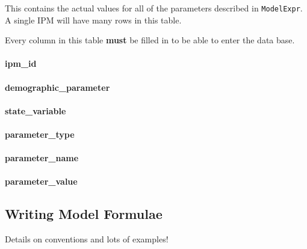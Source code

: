 \documentclass[]{article}
\let\oldparagraph\paragraph
\renewcommand{\paragraph}[1]{\oldparagraph{#1}\mbox{}}
\begin{document}
This contains the actual values for all of the parameters described in
\texttt{ModelExpr}. A single IPM will have many rows in this table.

Every column in this table \textbf{must} be filled in to be able to
enter the data base.

\paragraph{ipm\_id}\label{ipm_id-4}

\paragraph{demographic\_parameter}\label{demographic_parameter-1}

\paragraph{state\_variable}\label{state_variable-2}

\paragraph{parameter\_type}\label{parameter_type}

\paragraph{parameter\_name}\label{parameter_name}

\paragraph{parameter\_value}\label{parameter_value}

\hypertarget{model-forms}{\subsection{Writing Model
Formulae}\label{model-forms}}

Details on conventions and lots of examples!
\end{document}
